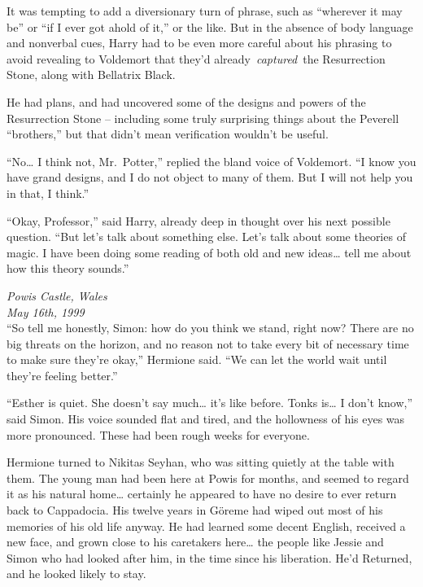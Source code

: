 It was tempting to add a diversionary turn of phrase, such as ``wherever
it may be'' or ``if I ever got ahold of it,'' or the like. But in the
absence of body language and nonverbal cues, Harry had to be even more
careful about his phrasing to avoid revealing to Voldemort that they'd
already~\emph{captured}~the Resurrection Stone, along with Bellatrix
Black.

He had plans, and had uncovered some of the designs and powers of the
Resurrection Stone -- including some truly surprising things about the
Peverell ``brothers,'' but that didn't mean verification wouldn't be
useful.

``No\ldots{} I think not, Mr.~Potter,'' replied the bland voice of
Voldemort. ``I know you have grand designs, and I do not object to many
of them. But I will not help you in that, I think.''

``Okay, Professor,'' said Harry, already deep in thought over his next
possible question. ``But let's talk about something else. Let's talk
about some theories of magic. I have been doing some reading of both old
and new ideas\ldots{} tell me about how this theory sounds.''

\mybreak

\emph{Powis Castle, Wales}\\
\emph{May 16th, 1999}\\

``So tell me honestly, Simon: how do you think we stand, right now?
There are no big threats on the horizon, and no reason not to take every
bit of necessary time to make sure they're okay,'' Hermione said. ``We
can let the world wait until they're feeling better.''

``Esther is quiet. She doesn't say much\ldots{} it's like before. Tonks
is\ldots{} I don't know,'' said Simon. His voice sounded flat and tired,
and the hollowness of his eyes was more pronounced. These had been rough
weeks for everyone.

Hermione turned to Nikitas Seyhan, who was sitting quietly at the table
with them. The young man had been here at Powis for months, and seemed
to regard it as his natural home\ldots{} certainly he appeared to have
no desire to ever return back to Cappadocia. His twelve years in Göreme
had wiped out most of his memories of his old life anyway. He had
learned some decent English, received a new face, and grown close to his
caretakers here\ldots{} the people like Jessie and Simon who had looked
after him, in the time since his liberation. He'd Returned, and he
looked likely to stay.

